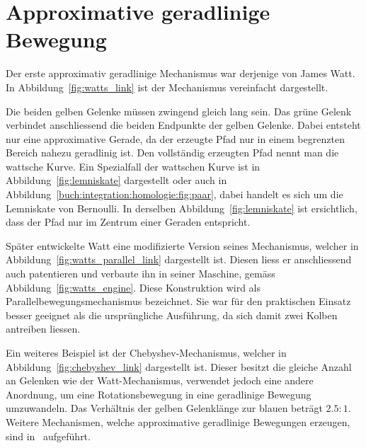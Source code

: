 %
%
%
%
\section{Approximative geradlinige Bewegung
\label{geradlinig:section:approximative_geradlinig}}
Der erste approximativ geradlinige Mechanismus war derjenige von James Watt.
In Abbildung~\ref{fig:watts_link} ist der Mechanismus vereinfacht 
dargestellt.

Die beiden gelben Gelenke müssen zwingend gleich lang sein.
Das grüne Gelenk verbindet anschliessend die beiden Endpunkte 
der gelben Gelenke.
Dabei entsteht nur eine approximative Gerade, da der erzeugte Pfad 
nur in einem begrenzten Bereich nahezu geradlinig ist.
Den vollständig erzeugten Pfad nennt man die wattsche Kurve.
Ein Spezialfall der wattschen Kurve ist in Abbildung~\ref{fig:lemniskate} 
dargestellt oder auch in Abbildung~\ref{buch:integration:homologie:fig:paar}, 
dabei handelt es sich um die Lemniskate von Bernoulli.
%
%
In derselben Abbildung~\ref{fig:lemniskate} ist ersichtlich, 
dass der Pfad nur im Zentrum einer Geraden entspricht.


Später entwickelte Watt eine modifizierte Version seines Mechanismus,
welcher in Abbildung~\ref{fig:watts_parallel_link} dargestellt ist.
Diesen liess er anschliessend auch patentieren und verbaute ihn in seiner Maschine,
gemäss Abbildung~\ref{fig:watts_engine}.
Diese Konstruktion wird als Parallelbewegungsmechanismus bezeichnet.
Sie war für den praktischen Einsatz besser geeignet 
als die ursprüngliche Ausführung, da sich damit zwei Kolben antreiben liessen.


Ein weiteres Beispiel ist der Chebyshev-Mechanismus, 
%
welcher in Abbildung~\ref{fig:chebyshev_link} dargestellt ist.
Dieser besitzt die gleiche Anzahl an Gelenken wie der Watt-Mechanismus, 
verwendet jedoch eine andere Anordnung, 
um eine Rotationsbewegung in eine geradlinige Bewegung umzuwandeln.
Das Verhältnis der gelben Gelenklänge zur blauen beträgt $2.5:1$.
Weitere Mechanismen, welche approximative geradlinige Bewegungen erzeugen, 
sind in~\cite{wiki_straight_line} aufgeführt.


